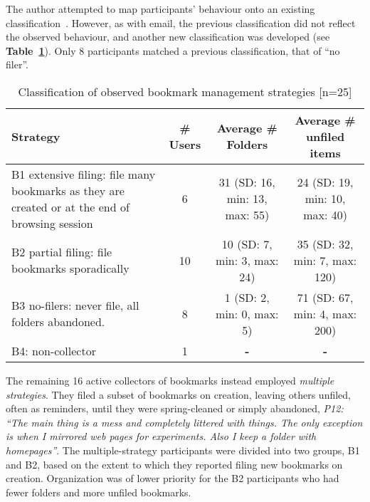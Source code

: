 The author attempted to map participants' behaviour onto an existing classification~\citep{da:98}. However, as with email, the previous classification did not reflect the observed behaviour, and another new classification was developed (see \textbf{Table~\ref{table:exp-study:bookmark_classification}}).  Only 8 participants matched a previous classification, that of ``no filer''. 

\begin{table}[hbtp]
\begin{center}
\begin{footnotesize}
\setlength{\extrarowheight}{2pt}
\begin{tabular}{|p{4cm}|c|c|c|} %
\hline
{\bf Strategy} & {\bf \# Users} & {\bf Average \# Folders} & {\bf Average \# unfiled items} \\
\hline
B1 extensive filing: file many bookmarks as they are created or at the end of browsing session &          6 & 31 (SD: 16, min: 13, max: 55)  & 24 (SD: 19, min: 10, max: 40) \\
\hline
B2 partial filing: file bookmarks sporadically  &         10 & 10 (SD: 7, min: 3, max: 24) & 35 (SD: 32, min: 7, max: 120) \\
\hline
B3 no-filers: never file, all folders abandoned. &          8 & 1 (SD: 2, min: 0, max: 5) & 71 (SD: 67, min: 4, max: 200) \\
\hline
B4: non-collector &          1 &    {\bf -} &    {\bf -} \\
\hline
\end{tabular}  
\end{footnotesize}
\caption{Classification of observed bookmark management strategies [n=25]}
\label{table:exp-study:bookmark_classification}
\end{center}
\end{table}
\normalsize

The remaining 16 active collectors of bookmarks instead employed \textit{multiple strategies}. They filed a subset of bookmarks on creation, leaving others unfiled, often as reminders, until they were spring-cleaned or simply abandoned, \textit{P12: ``The main thing is a mess and completely littered with things. The only exception is when I mirrored web pages for experiments. Also I keep a folder with homepages''}. The multiple-strategy participants were divided into two groups, B1 and B2, based on the extent to which they reported filing new bookmarks on creation. Organization was of lower priority for the B2 participants who had fewer folders and more unfiled bookmarks.

